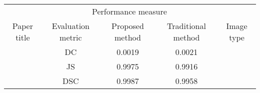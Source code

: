 \documentclass{article}
\begin{document}
\begin{tabular}{*{5}{c}}
    \toprule
    & \multicolumn{3}{c}{Performance measure} & \\ \cmidrule(lr){2-4}
    Paper title & Evaluation metric & Proposed method & Traditional method & Image type \\ \midrule
    & DC & 0.0019 & 0.0021 \\
    & JS & 0.9975 & 0.9916 \\
    & DSC & 0.9987 & 0.9958 \\
    \bottomrule
  \end{tabular}
\end{document}
